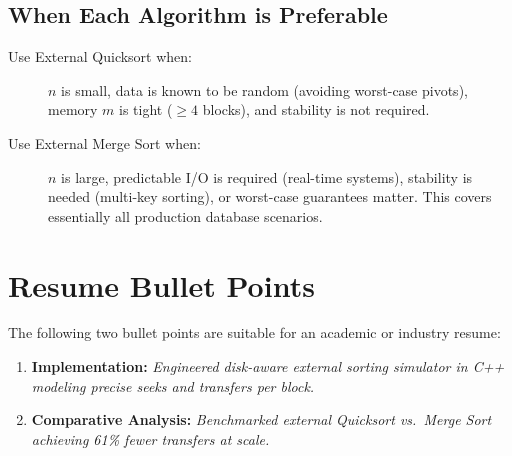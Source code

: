 \documentclass[12pt,a4paper]{article}
\begin{document}
\subsection{When Each Algorithm is Preferable}

\begin{description}
  \item[Use External Quicksort when:]
    $n$ is small, data is known to be random (avoiding worst-case pivots),
    memory $m$ is tight ($\ge 4$ blocks), and stability is not required.

  \item[Use External Merge Sort when:]
    $n$ is large, predictable I/O is required (real-time systems), stability
    is needed (multi-key sorting), or worst-case guarantees matter. This covers
    essentially all production database scenarios.
\end{description}

\section{Resume Bullet Points}

The following two bullet points are suitable for an academic or industry resume:

\begin{enumerate}
  \item \textbf{Implementation:}
        \emph{Engineered disk-aware external sorting simulator in C++ modeling precise seeks and transfers per block.}

  \item \textbf{Comparative Analysis:}
        \emph{Benchmarked external Quicksort vs.\ Merge Sort achieving 61\% fewer transfers at scale.}
\end{enumerate}

\end{document}
